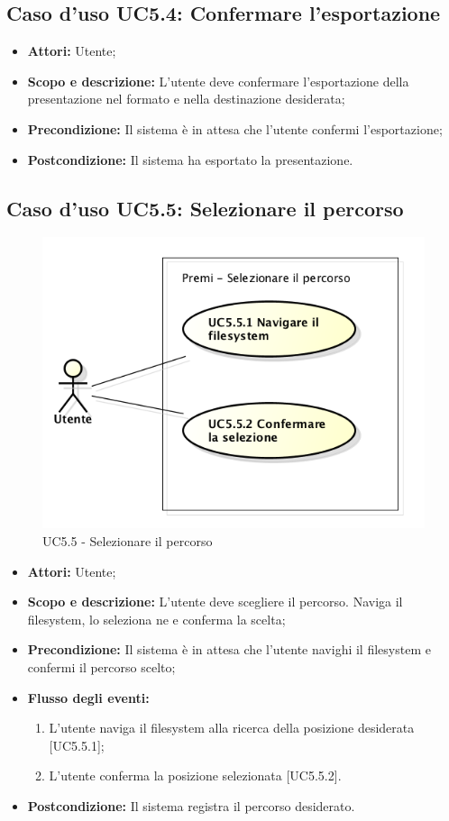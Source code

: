 \subsection{Caso d'uso UC5.4: Confermare l'esportazione}
	\begin{itemize}
		\item \textbf{Attori:} Utente;
		\item \textbf{Scopo e descrizione:} L'utente deve confermare l'esportazione della presentazione nel formato e nella destinazione desiderata;
		\item \textbf{Precondizione:} Il sistema è in attesa che l'utente confermi l'esportazione;
		\item \textbf{Postcondizione:} Il sistema ha esportato la presentazione.
	\end{itemize}
	
	
\subsection{Caso d'uso UC5.5: Selezionare il percorso}
	\begin{figure}[h] 
		\centering 
		\includegraphics[scale=0.45] {img/UC5.5.png} 
		\caption{UC5.5 - Selezionare il percorso} 
	\end{figure}
	\begin{itemize}
		\item \textbf{Attori:} Utente;
		\item \textbf{Scopo e descrizione:} L'utente deve scegliere il percorso. Naviga il filesystem, lo seleziona ne e conferma la scelta;
		\item \textbf{Precondizione:} Il sistema è in attesa che l'utente navighi il filesystem e confermi il percorso scelto;
		\item \textbf{Flusso degli eventi:}
		\begin{enumerate}
			\item L'utente naviga il filesystem alla ricerca della posizione desiderata [UC5.5.1];
			\item L'utente conferma la posizione selezionata [UC5.5.2].
		\end{enumerate}
		\item \textbf{Postcondizione:} Il sistema registra il percorso desiderato.
	\end{itemize}
	
